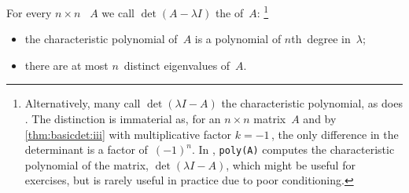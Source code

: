 \begin{theorem} \label{thm:geecp}
For every \(n\times n\) ~\(A\) we call \(\det(A-\lambda I)\) the  of~\(A\):
\footnote{Alternatively, many call \(\det(\lambda I-A)\) the characteristic polynomial, as does \script.  
The distinction is immaterial as,  for an \(n\times n\) matrix~\(A\) and by \autoref{thm:basicdet:iii} with multiplicative factor \(k=-1\)\,, the only difference in the determinant is a factor of~\((-1)^n\).
In \script, \texttt{poly(A)} computes the characteristic polynomial of the matrix,  \(\det(\lambda I-A)\), which might be useful for exercises, but is rarely useful in practice due to poor conditioning.}
\begin{itemize}
\item the characteristic polynomial of~\(A\) is a polynomial of \(n\)th~degree in~\(\lambda\);
\item  there are at most \(n\)~distinct eigenvalues of~\(A\).
\end{itemize}
\end{theorem}

